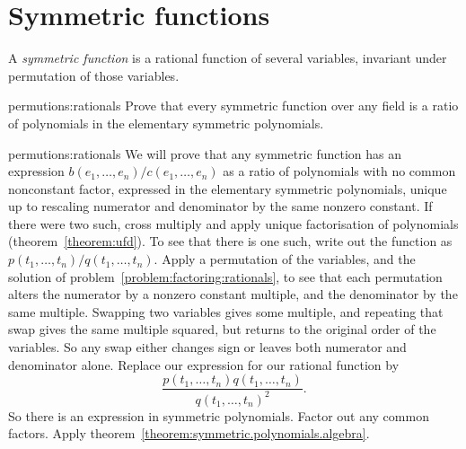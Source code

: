 \section{Symmetric functions}
A \emph{symmetric function} is a rational function of several variables, invariant under permutation of those variables.
\begin{problem}{permutions:rationals}
Prove that every symmetric function over any field is a ratio of polynomials in the elementary symmetric polynomials.
\end{problem}
\begin{answer}{permutions:rationals}
We will prove that any symmetric function has an expression \(b(e_1,\dots,e_n)/c(e_1,\dots,e_n)\) as a ratio of polynomials with no common nonconstant factor, expressed in the elementary symmetric polynomials, unique up to rescaling numerator and denominator by the same nonzero constant.
If there were two such, cross multiply and apply unique factorisation of polynomials (theorem~\vref{theorem:ufd}).
To see that there is one such, write out the function as \(p(t_1,\dots,t_n)/q(t_1,\dots,t_n)\).
Apply a permutation of the variables, and the solution of problem~\vref{problem:factoring:rationals}, to see that each permutation alters the numerator by a nonzero constant multiple, and the denominator by the same multiple.
Swapping two variables gives some multiple, and repeating that swap gives the same multiple squared, but returns to the original order of the variables.
So any swap either changes sign or leaves both numerator and denominator alone.
Replace our expression for our rational function by
\[
\frac{p(t_1,\dots,t_n)q(t_1,\dots,t_n)}{q(t_1,\dots,t_n)^2}.
\]
So there is an expression in symmetric polynomials.
Factor out any common factors.
Apply theorem~\vref{theorem:symmetric.polynomials.algebra}.
\end{answer}

